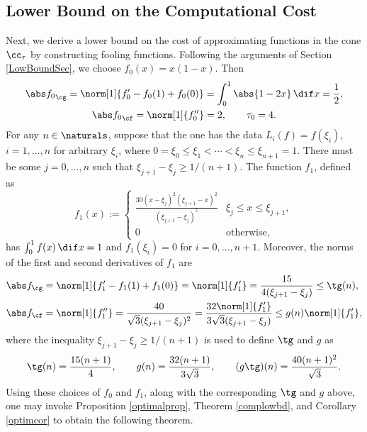 \subsection{Lower Bound on the Computational Cost}
Next, we derive a lower bound on the cost of approximating functions in the cone $\cc_{\tau}$ by constructing fooling functions. Following the arguments of Section \ref{LowBoundSec}, we choose  $f_0(x)=x(1-x).$ Then
\begin{gather*}
\Gnorm{f_0}=\norm[1]{f'_0-f_0(1)+f_0(0)}=\int_0^1 \abs{1-2x} \, \dif x = \frac{1}{2}, \\ \Fnorm{f_0}=\norm[1]{f''_0}=2, \qquad \tau_0=4.
\end{gather*}
For any $n \in \naturals$, suppose that the one has the data $L_i(f)=f(\xi_i)$, $i=1, \ldots, n$ for arbitrary $\xi_i$, where $0=\xi_0 \le \xi_1 < \cdots < \xi_n \le \xi_{n+1} = 1$.  There must be some $j=0, \ldots, n$ such that $\xi_{j+1} - \xi_j \ge 1/(n+1)$.  The function $f_{1}$, defined as
$$
f_{1}(x):=\begin{cases} \displaystyle
\frac{30(x-\xi_{j})^{2}(\xi_{j+1}-x)^{2}}{(\xi_{j+1}-\xi_{j})^5} & \xi_{j} \le x \leq \xi_{j+1},\\
0 & \text{otherwise},
\end{cases}
$$
has $\int_0^1 f(x) \, \dif x=1$ and $f_1(\xi_i)=0$ for $i=0, \ldots, n+1$.  Moreover, the norms of the first and second derivatives of $f_1$ are
\begin{align*}
\Gnorm{f}&=\norm[1]{f'_1-f_1(1)+f_1(0)}=\norm[1]{f'_1}=\frac{15}{4(\xi_{j+1}-\xi_{j})}\leq \tg(n),\\
\Fnorm{f}&=\norm[1]{f''_1}=\frac{40}{\sqrt{3}(\xi_{j+1}-\xi_{j})^2}
=\frac{32\norm[1]{f'_1}}{3\sqrt{3}(\xi_{j+1}-\xi_{j})}
 \leq g(n) \norm[1]{f'_1},
\end{align*}
where the inequality $\xi_{j+1} - \xi_j \ge 1/(n+1)$ is used to define $\tg$ and $g$ as
\[
\tg(n) = \frac{15(n+1)}{4}, \qquad g(n) = \frac{32(n+1)}{3\sqrt{3}}, \qquad (g\tg)(n) = \frac{40(n+1)^2}{\sqrt{3}}.
\]
Using these choices of $f_0$ and $f_1$, along with the corresponding $\tg$ and $g$ above, one may invoke Proposition \ref{optimalprop}, Theorem \ref{complowbd}, and Corollary \ref{optimcor} to obtain the following theorem.

